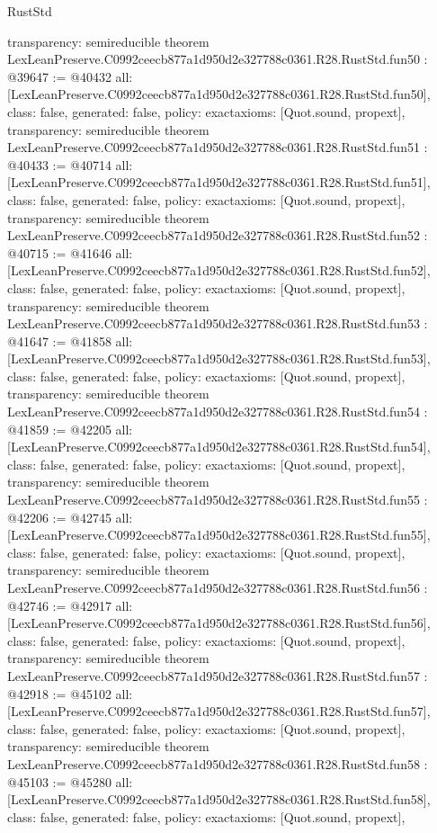 \begin{lexlean}{RustStd}
\begin{coremodule}
{  transparency: semireducible
}
theorem LexLeanPreserve.C0992ceecb877a1d950d2e327788c0361.R28.RustStd.fun50 : @39647 := @40432 {
  all: [LexLeanPreserve.C0992ceecb877a1d950d2e327788c0361.R28.RustStd.fun50],
  class: false,
  generated: false,
  policy: exact{axioms: [Quot.sound, propext]},
  transparency: semireducible
}
theorem LexLeanPreserve.C0992ceecb877a1d950d2e327788c0361.R28.RustStd.fun51 : @40433 := @40714 {
  all: [LexLeanPreserve.C0992ceecb877a1d950d2e327788c0361.R28.RustStd.fun51],
  class: false,
  generated: false,
  policy: exact{axioms: [Quot.sound, propext]},
  transparency: semireducible
}
theorem LexLeanPreserve.C0992ceecb877a1d950d2e327788c0361.R28.RustStd.fun52 : @40715 := @41646 {
  all: [LexLeanPreserve.C0992ceecb877a1d950d2e327788c0361.R28.RustStd.fun52],
  class: false,
  generated: false,
  policy: exact{axioms: [Quot.sound, propext]},
  transparency: semireducible
}
theorem LexLeanPreserve.C0992ceecb877a1d950d2e327788c0361.R28.RustStd.fun53 : @41647 := @41858 {
  all: [LexLeanPreserve.C0992ceecb877a1d950d2e327788c0361.R28.RustStd.fun53],
  class: false,
  generated: false,
  policy: exact{axioms: [Quot.sound, propext]},
  transparency: semireducible
}
theorem LexLeanPreserve.C0992ceecb877a1d950d2e327788c0361.R28.RustStd.fun54 : @41859 := @42205 {
  all: [LexLeanPreserve.C0992ceecb877a1d950d2e327788c0361.R28.RustStd.fun54],
  class: false,
  generated: false,
  policy: exact{axioms: [Quot.sound, propext]},
  transparency: semireducible
}
theorem LexLeanPreserve.C0992ceecb877a1d950d2e327788c0361.R28.RustStd.fun55 : @42206 := @42745 {
  all: [LexLeanPreserve.C0992ceecb877a1d950d2e327788c0361.R28.RustStd.fun55],
  class: false,
  generated: false,
  policy: exact{axioms: [Quot.sound, propext]},
  transparency: semireducible
}
theorem LexLeanPreserve.C0992ceecb877a1d950d2e327788c0361.R28.RustStd.fun56 : @42746 := @42917 {
  all: [LexLeanPreserve.C0992ceecb877a1d950d2e327788c0361.R28.RustStd.fun56],
  class: false,
  generated: false,
  policy: exact{axioms: [Quot.sound, propext]},
  transparency: semireducible
}
theorem LexLeanPreserve.C0992ceecb877a1d950d2e327788c0361.R28.RustStd.fun57 : @42918 := @45102 {
  all: [LexLeanPreserve.C0992ceecb877a1d950d2e327788c0361.R28.RustStd.fun57],
  class: false,
  generated: false,
  policy: exact{axioms: [Quot.sound, propext]},
  transparency: semireducible
}
theorem LexLeanPreserve.C0992ceecb877a1d950d2e327788c0361.R28.RustStd.fun58 : @45103 := @45280 {
  all: [LexLeanPreserve.C0992ceecb877a1d950d2e327788c0361.R28.RustStd.fun58],
  class: false,
  generated: false,
  policy: exact{axioms: [Quot.sound, propext]},
}
\end{coremodule}
\end{lexlean}
